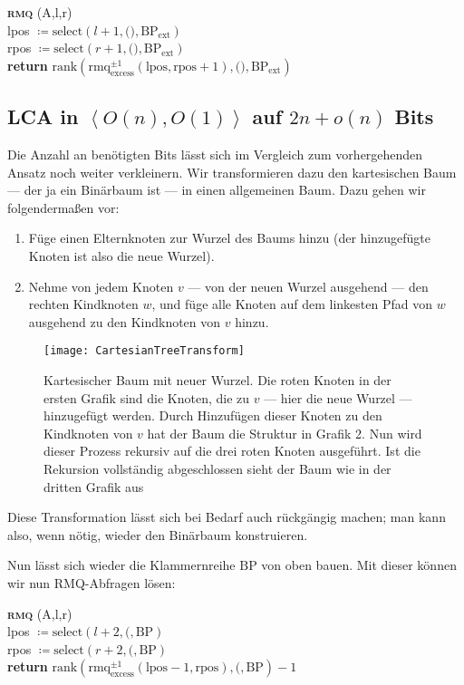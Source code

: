 \begin{itemize}
  \begin{pseudocode}
    \textbf{\textsc{rmq}} (A,l,r) \\
    lpos \( \coloneqq \text{select}(l+1, \texttt{()}, \text{BP}_{\text{ext}}) \) \\
    rpos \( \coloneqq \text{select}(r+1, \texttt{()}, \text{BP}_{\text{ext}}) \) \\
    \textbf{return} \( \text{rank} (\text{rmq}^{\pm 1}_{\text{excess}}(\text{lpos}, \text{rpos} + 1), \texttt{()}, \text{BP}_{\text{ext}}) \)
  \end{pseudocode}
\end{itemize}

\subsection{LCA in \( \left\langle O(n),O(1) \right\rangle \) auf \( 2n+o(n) \) Bits}

Die Anzahl an benötigten Bits lässt sich im Vergleich zum vorhergehenden Ansatz noch weiter verkleinern. Wir transformieren dazu den kartesischen Baum --- der ja ein Binärbaum ist --- in einen allgemeinen Baum. Dazu gehen wir folgendermaßen vor:

\begin{enumerate}
  \item Füge einen Elternknoten zur Wurzel des Baums hinzu (der hinzugefügte Knoten ist also die neue Wurzel).
  \item Nehme von jedem Knoten \( v \) --- von der neuen Wurzel ausgehend --- den rechten Kindknoten \( w \), und füge alle Knoten auf dem linkesten Pfad von \( w \) ausgehend zu den Kindknoten von \( v \) hinzu.
\end{enumerate}

\begin{figure}[H]
  \texttt{[image: CartesianTreeTransform]}
  \caption{Kartesischer Baum mit neuer Wurzel. Die roten Knoten in der ersten Grafik sind die Knoten, die zu \( v \) --- hier die neue Wurzel --- hinzugefügt werden. Durch Hinzufügen dieser Knoten zu den Kindknoten von \( v \) hat der Baum die Struktur in Grafik 2. Nun wird dieser Prozess rekursiv auf die drei roten Knoten ausgeführt. Ist die Rekursion vollständig abgeschlossen sieht der Baum wie in der dritten Grafik aus}
\end{figure}

Diese Transformation lässt sich bei Bedarf auch rückgängig machen; man kann also, wenn nötig, wieder den Binärbaum konstruieren.

Nun lässt sich wieder die Klammernreihe \( \text{BP} \) von oben bauen. Mit dieser können wir nun RMQ-Abfragen lösen:

\begin{pseudocode}
  \textbf{\textsc{rmq}} (A,l,r) \\
  lpos \( \coloneqq \text{select}(l+2, \texttt{(}, \text{BP}) \) \\
  rpos \( \coloneqq \text{select}(r+2, \texttt{(}, \text{BP}) \) \\
  \textbf{return} \( \text{rank}(\text{rmq}_{\text{excess}}^{\pm 1}(\text{lpos} - 1, \text{rpos}), \texttt{(}, \text{BP}) -1 \)
\end{pseudocode}